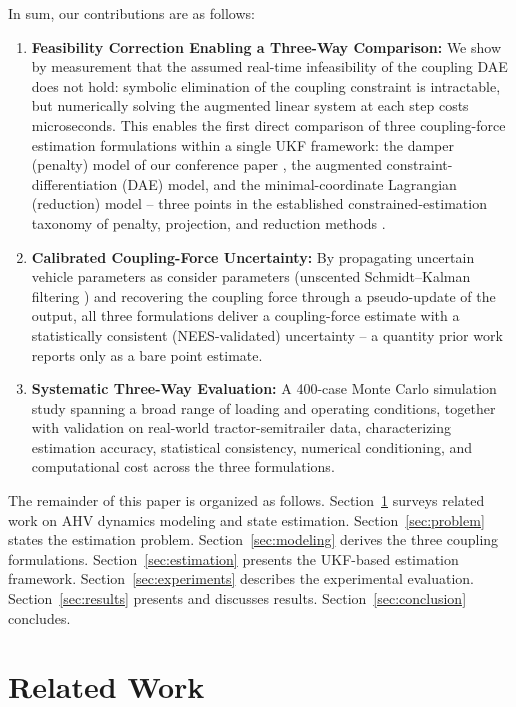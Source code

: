 \documentclass[conference]{IEEEtran}
\begin{document}
In sum, our contributions are as follows:
\begin{enumerate}
    \item \textbf{Feasibility Correction Enabling a Three-Way Comparison:} We show by measurement that the assumed real-time infeasibility of the coupling DAE does not hold: symbolic elimination of the coupling constraint is intractable, but numerically solving the augmented linear system at each step costs microseconds. This enables the first direct comparison of three coupling-force estimation formulations within a single UKF framework: the damper (penalty) model of our conference paper \cite{ceder_bayesian_2025}, the augmented constraint-differentiation (DAE) model, and the minimal-coordinate Lagrangian (reduction) model -- three points in the established constrained-estimation taxonomy of penalty, projection, and reduction methods \cite{simon_kalman_2010, teixeira_state_2009}.
    \item \textbf{Calibrated Coupling-Force Uncertainty:} By propagating uncertain vehicle parameters as consider parameters (unscented Schmidt--Kalman filtering \cite{stauch_unscented_2015, woodbury_consider_2010}) and recovering the coupling force through a pseudo-update of the output, all three formulations deliver a coupling-force estimate with a statistically consistent (NEES-validated) uncertainty -- a quantity prior work reports only as a bare point estimate.
    \item \textbf{Systematic Three-Way Evaluation:} A 400-case Monte Carlo simulation study spanning a broad range of loading and operating conditions, together with validation on real-world tractor-semitrailer data, characterizing estimation accuracy, statistical consistency, numerical conditioning, and computational cost across the three formulations.
\end{enumerate}

The remainder of this paper is organized as follows. Section~\ref{sec:relatedwork} surveys related work on AHV dynamics modeling and state estimation. Section~\ref{sec:problem} states the estimation problem. Section~\ref{sec:modeling} derives the three coupling formulations. Section~\ref{sec:estimation} presents the UKF-based estimation framework. Section~\ref{sec:experiments} describes the experimental evaluation. Section~\ref{sec:results} presents and discusses results. Section~\ref{sec:conclusion} concludes.

\section{Related Work}
\label{sec:relatedwork}
\end{document}
